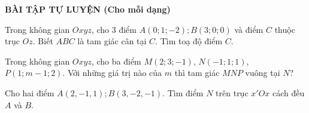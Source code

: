 \begin{center}
	\textbf{BÀI TẬP TỰ LUYỆN (Cho mỗi dạng)}
\end{center}
\begin{bt} %
	Trong không gian $Oxyz$, cho 3 điểm $A\left(0;1;-2\right);B\left(3;0;0\right)$ và điểm $C$ thuộc trục $Oz$. Biết $ABC$ là tam giác cân tại $C$. Tìm toạ độ điểm $C$.
	
\end{bt}
\begin{bt} %
	Trong không gian $Oxyz$, cho ba điểm $M\left(2;3;-1\right)$, $N\left(-1;1;1\right)$, $P\left(1;m-1;2\right)$. Với những giá trị nào của $m$ thì tam giác $MNP$ vuông tại $N$?
\end{bt}
\begin{bt} %
	Cho hai điểm $A\left({2,-1,1}\right);B\left({3,-2,-1}\right)$. Tìm điểm $N$ trên trục  $x'Ox$ cách đều $A$ và $B$.
	
\end{bt}
